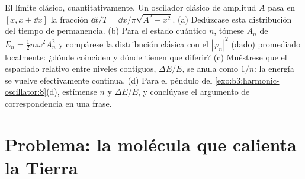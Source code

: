 \begin{exercise}[$\star\star\star$]\label{exo:b3:harmonic-oscillator:12}
El límite clásico, cuantitativamente. Un oscilador clásico de
amplitud $A$ pasa en $[x, x + \dd x]$ la fracción $\dd
t/T = \dd x/\pi\sqrt{A^2 - x^2}$. (a) Dedúzcase esta distribución del tiempo
de permanencia. (b) Para el estado cuántico $n$, tómese $A_n$ de $E_n =
\tfrac12 m\omega^2A_n^2$ y compárese la distribución clásica con
el $|\varphi_n|^2$ (dado) promediado localmente: ¿dónde coinciden y dónde
tienen que diferir? (c) Muéstrese que el espaciado relativo entre niveles
contiguos, $\Delta E/E$, se anula como $1/n$: la energía se vuelve
efectivamente continua. (d) Para el péndulo del
\cref{exo:b3:harmonic-oscillator:8}(d), estímense $n$ y $\Delta
E/E$, y conclúyase el argumento de correspondencia en una frase.
\end{exercise}

\section{Problema: la molécula que calienta la Tierra}


